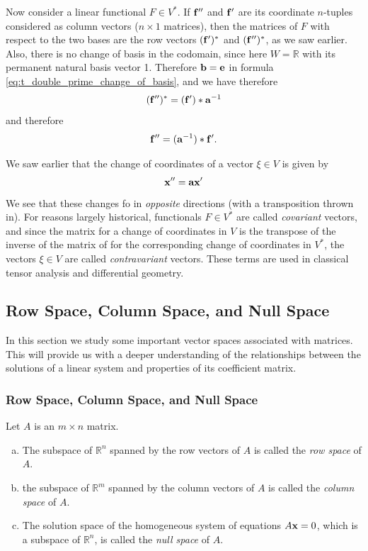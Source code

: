 \documentclass[12pt,letterpaper,reqno]{article}
\numberwithin{equation}{section}
\newcommand{\ti}[1]{\textit{#1}}
\newcommand{\fixme}[1]{{\color{orange}{[#1]}}}
\begin{document}
Now consider a linear functional $F \in V^*$. If ${\bf f}''$ and ${\bf f}'$ are its coordinate $n$-tuples considered as column vectors ($n \times 1$ matrices), then the matrices of $F$ with respect to the two bases are the row vectors $({\bf f}')^*$ and $({\bf f}'')^*$, as we saw earlier. Also, there is no change of basis in the codomain, since here $W=\mathbb{R}$ with its permanent natural basis vector 1. Therefore ${\bf b}={\bf e}$ in formula \eqref{eq:t_double_prime_change_of_basis}, and we have therefore
\begin{align*}
	({\bf f}'')^*=({\bf f}')*{\bf a}^{-1}
\end{align*}
and therefore
\begin{align*}
	{\bf f}''=({\bf a}^{-1})*{\bf f}'.
\end{align*}

We saw earlier that the change of coordinates of a vector $\xi \in V$ is given by
\begin{align*}
	{\bf x}''={\bf a}{\bf x}'
\end{align*}
We see that these changes fo in \ti{opposite} directions (with a transposition thrown in). For reasons largely historical, functionals $F \in V^*$ are called \ti{covariant} vectors, and since the matrix for a change of coordinates in $V$ is the transpose of the inverse of the matrix of for the corresponding change of coordinates in $V^*$, the vectors $\xi \in V$ are called \ti{contravariant} vectors. These terms are used in classical tensor analysis and differential geometry.

\begin{example}
\fixme{Include example.}	
\end{example}

\subsection{Row Space, Column Space, and Null Space}	
In this section we study some important vector spaces associated with matrices. This will provide us with a deeper understanding of the relationships between the solutions of a linear system and properties of its coefficient matrix.

\subsubsection{Row Space, Column Space, and Null Space}	
\begin{defn}
Let $A$ is an $m \times n$ matrix.
\begin{enumerate}[(a)]
	\item The subspace of $\mathbb{R}^n$ spanned by the row vectors of $A$ is called the \ti{row space} of $A$.
	\item the subspace of $\mathbb{R}^m$ spanned by the column vectors of $A$ is called the \ti{column space} of $A$.
	\item The solution space of the homogeneous system of equations $A{\bf x}=0$, which is a subspace of $\mathbb{R}^n$, is called the \ti{null space} of $A$.
\end{enumerate}
\end{defn}
	
\end{document}
